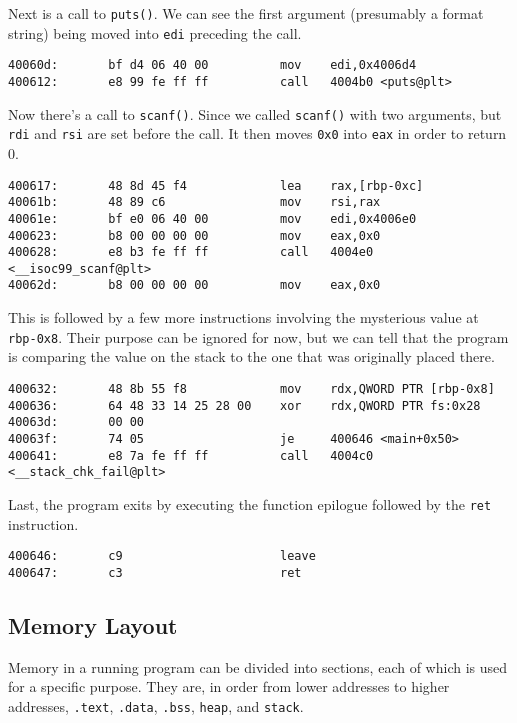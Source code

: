 Next is a call to \texttt{puts()}. We can see the first argument (presumably a
format string) being moved into \texttt{edi} preceding the call.
\begin{lstlisting}
40060d:       bf d4 06 40 00          mov    edi,0x4006d4
400612:       e8 99 fe ff ff          call   4004b0 <puts@plt>
\end{lstlisting}

Now there's a call to \texttt{scanf()}. Since we called \texttt{scanf()} with
two arguments, but \texttt{rdi} and \texttt{rsi} are set before the call. It
then moves \texttt{0x0} into \texttt{eax} in order to return 0.

\begin{lstlisting}
400617:       48 8d 45 f4             lea    rax,[rbp-0xc]
40061b:       48 89 c6                mov    rsi,rax
40061e:       bf e0 06 40 00          mov    edi,0x4006e0
400623:       b8 00 00 00 00          mov    eax,0x0
400628:       e8 b3 fe ff ff          call   4004e0 <__isoc99_scanf@plt>
40062d:       b8 00 00 00 00          mov    eax,0x0
\end{lstlisting}

This is followed by a few more instructions involving the mysterious value at
\texttt{rbp-0x8}. Their purpose can be ignored for now, but we can tell that the
program is comparing the value on the stack to the one that was originally
placed there.
\begin{lstlisting}
400632:       48 8b 55 f8             mov    rdx,QWORD PTR [rbp-0x8]
400636:       64 48 33 14 25 28 00    xor    rdx,QWORD PTR fs:0x28
40063d:       00 00 
40063f:       74 05                   je     400646 <main+0x50>
400641:       e8 7a fe ff ff          call   4004c0 <__stack_chk_fail@plt>
\end{lstlisting}

Last, the program exits by executing the function epilogue followed by the
\texttt{ret} instruction.
\begin{lstlisting}
400646:       c9                      leave  
400647:       c3                      ret    
\end{lstlisting}

\subsection{Memory Layout}
Memory in a running program can be divided into sections, each of which is used
for a specific purpose. They are, in order from lower addresses to higher
addresses, \texttt{.text}, \texttt{.data}, \texttt{.bss}, \texttt{heap}, and
\texttt{stack}.

